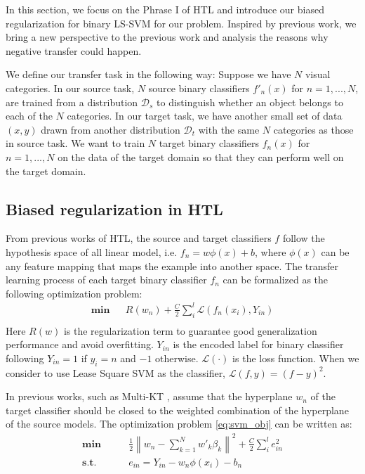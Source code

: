 In this section, we focus on the Phrase I of HTL and introduce our biased regularization for binary LS-SVM for our problem. Inspired by previous work, we bring a new perspective to the previous work and analysis the reasons why negative transfer could happen.

We define our transfer task in the following way: Suppose we have $N$ visual categories. 
In our source task, $N$ source binary classifiers $f'_n(x)$ for $n=1,...,N$, are trained from a distribution $\mathcal{D}_s$ to distinguish whether an object belongs to each of the $N$ categories. In our target task, we have another small set of data $(x,y)$ drawn from another distribution $\mathcal{D}_t$ with the same $N$ categories as those in source task. We want to train $N$ target binary classifiers $f_n(x)$ for $n=1,...,N$ on the data of the target domain so that they can perform well on the target domain.

\subsection{Biased regularization in HTL}
From previous works of HTL, the source and target classifiers $f$ follow the hypothesis space of all linear model, i.e. $f_n = w\phi(x)+b$, where $\phi(x)$ can be any feature mapping that maps the example into another space. The transfer learning process of each target binary classifier $f_n$ can be formalized as the following optimization problem:
\begin{equation}\label{eq:svm_obj}
\begin{aligned}
\textbf{min} && R({w_n}) + \frac{C}{2}\sum\limits_i^l {\mathcal{L}(f_n(x_i),Y_{in})} \\
\end{aligned}
\end{equation}
Here $R({w})$ is the regularization term to guarantee good generalization performance and avoid overfitting. $Y_{in}$ is the encoded label for binary classifier following $Y_{in}=1$ if $y_i=n$ and $-1$ otherwise. $\mathcal{L}(\cdot)$ is the loss function. When we consider to use Lease Square SVM as the classifier, $\mathcal{L}(f,y) = (f-y)^2$. 

In previous works, such as Multi-KT \cite{tommasi2014learning} , assume that the hyperplane $w_n$ of the target classifier should be closed to the weighted combination of the hyperplane of the source models. The optimization problem \eqref{eq:svm_obj} can be written as:
\begin{equation}\label{eq:opt}
\begin{aligned}
\textbf{min} \qquad & \frac{1}{2}{\left\| {{w_{n}} - \sum\limits_{k = 1}^N {w{'_k}{\beta _k}} } \right\|^2} + \frac{C}{2}\sum\limits_i^l {{e_{in} ^2}}\\
\textbf{s.t.} \qquad &  e_{in} = Y_{in}-w_n\phi(x_i)-b_n
\end{aligned}
\end{equation}

